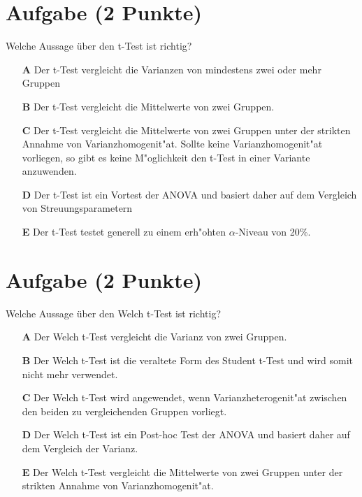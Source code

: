 \documentclass[a4paper, 10pt]{scrartcl}\usepackage[]{graphicx}\usepackage[]{xcolor}
\begin{document}
\section{Aufgabe \hfill (2 Punkte)}

Welche Aussage {\"u}ber den t-Test ist richtig?



\begin{enumerate}
\item [\textbf{A} \msquare] Der t-Test vergleicht die Varianzen von mindestens zwei oder mehr Gruppen
\item [\textbf{B} \msquare] Der t-Test vergleicht die Mittelwerte von zwei Gruppen.
\item [\textbf{C} \msquare] Der t-Test vergleicht die Mittelwerte von zwei Gruppen unter der strikten Annahme von Varianzhomogenit{"a}t. Sollte keine Varianzhomogenit{"a}t vorliegen, so gibt es keine M{"o}glichkeit den t-Test in einer Variante anzuwenden.
\item [\textbf{D} \msquare] Der t-Test ist ein Vortest der ANOVA und basiert daher auf dem Vergleich von Streuungsparametern
\item [\textbf{E} \msquare] Der t-Test testet generell zu einem erh{"o}hten $\alpha$-Niveau von 20\%.
\end{enumerate}

\section{Aufgabe \hfill (2 Punkte)}

Welche Aussage {\"u}ber den Welch t-Test ist richtig?



\begin{enumerate}
\item [\textbf{A} \msquare] Der Welch t-Test vergleicht die Varianz von zwei Gruppen.
\item [\textbf{B} \msquare] Der Welch t-Test ist die veraltete Form des Student t-Test und wird somit nicht mehr verwendet.
\item [\textbf{C} \msquare] Der Welch t-Test wird angewendet, wenn Varianzheterogenit{"a}t zwischen den beiden zu vergleichenden Gruppen vorliegt.
\item [\textbf{D} \msquare] Der Welch t-Test ist ein Post-hoc Test der ANOVA und basiert daher auf dem Vergleich der Varianz.
\item [\textbf{E} \msquare] Der Welch t-Test vergleicht die Mittelwerte von zwei Gruppen unter der strikten Annahme von Varianzhomogenit{"a}t.
\end{enumerate}
\end{document}
